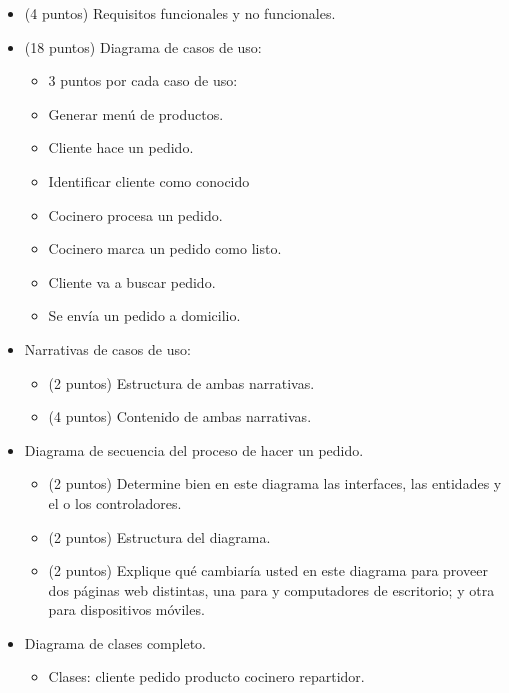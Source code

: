 \documentclass[11pt,letterpaper]{article}
\begin{document}
\begin{spacing}{1.2}
\begin{NewAnswer}
    \begin{itemize}
        \item (4 puntos) Requisitos funcionales y no funcionales.
        \item (18 puntos) Diagrama de casos de uso:
        \begin{itemize}
            \item 3 puntos por cada caso de uso:
            \item Generar menú de productos.
            \item Cliente hace un pedido.
            \item Identificar cliente como conocido
            \item Cocinero procesa un pedido.
            \item Cocinero marca un pedido como listo.
            \item Cliente va a buscar pedido.
            \item Se envía un pedido a domicilio.
        \end{itemize}
        \item Narrativas de casos de uso:
        \begin{itemize}
            \item (2 puntos) Estructura de ambas narrativas.
            \item (4 puntos) Contenido de ambas narrativas.
        \end{itemize}
        \item Diagrama de secuencia del proceso de hacer un pedido.
        \begin{itemize}
            \item (2 puntos) Determine bien en este diagrama las interfaces, las entidades y el o los controladores.
            \item (2 puntos) Estructura del diagrama.
            \item (2 puntos) Explique qué cambiaría usted en este diagrama para proveer dos páginas web distintas,
                una para  y computadores de escritorio; y otra para dispositivos móviles.
        \end{itemize}
        \item Diagrama de clases completo.
        \begin{itemize}
            \item Clases:
cliente
pedido
producto
cocinero
repartidor.
        \end{itemize}
    \end{itemize}
\end{NewAnswer}

\end{spacing}
\end{document}

